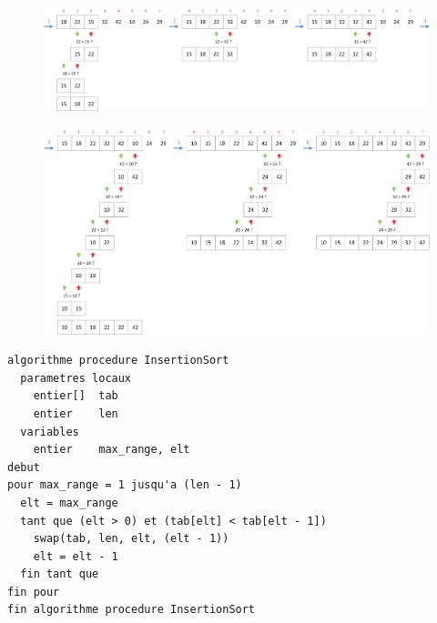 \documentclass[11pt,a4paper]{article}
\begin{document}
\begin{figure}[ht!]
\centering
\centerline{
\includegraphics[width=1.18\textwidth]{img/InsertionSort_part1_2.png}
}
\end{figure}

\begin{figure}[ht!]
\centering
\centerline{
\includegraphics[width=1.18\textwidth]{img/InsertionSort_part2.png}
}
\end{figure}

\clearpage

\vfillFirst



\begin{table}[ht!]
  \centering
\begin{lstlisting}[style=algorithmique]
algorithme procedure InsertionSort
  parametres locaux
    entier[]  tab
    entier    len
  variables
    entier    max_range, elt
debut
pour max_range = 1 jusqu'a (len - 1)
  elt = max_range
  tant que (elt > 0) et (tab[elt] < tab[elt - 1])
    swap(tab, len, elt, (elt - 1))
    elt = elt - 1
  fin tant que
fin pour
fin algorithme procedure InsertionSort \end{lstlisting}
\end{table}
\end{document}
